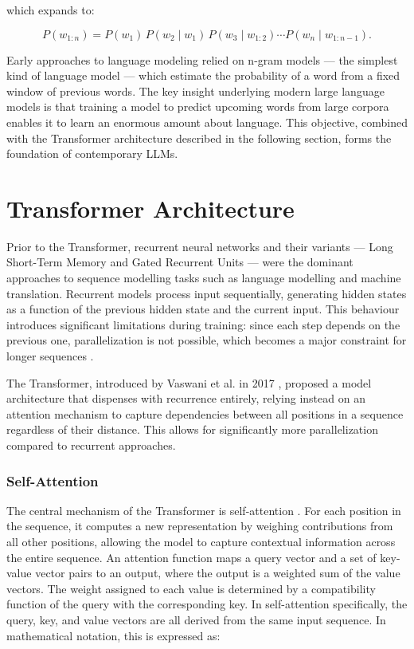     which expands to:

    \begin{equation}
    P(w_{1:n}) = P(w_1)\,P(w_2 \mid w_1)\,P(w_3 \mid w_{1:2})
    \cdots P(w_n \mid w_{1:n-1}).
    \label{eq:lm-expanded}
    \end{equation}

  Early approaches to language modeling relied on n-gram models
  --- the simplest kind of language model --- which estimate the
  probability of a word from a fixed window of previous words.
  The key insight underlying modern large language models is that
  training a model to predict upcoming words from large corpora
  enables it to learn an enormous amount about language. This objective, combined with the
  Transformer architecture described in the following section,
  forms the foundation of contemporary LLMs.

\section{Transformer Architecture}
\label{sec:transformer}
Prior to the Transformer, recurrent neural networks and their
variants --- Long Short-Term Memory and Gated Recurrent Units --- were
the dominant approaches to sequence modelling tasks such as language
modelling and machine translation. Recurrent models process input
sequentially, generating hidden states as a function of the previous
hidden state and the current input. This behaviour introduces significant limitations
during
  training: since each step depends on the previous one,
  parallelization is not possible, which becomes a major
  constraint for longer sequences \cite{vaswani2017}.

The Transformer, introduced by Vaswani et al. in 2017
  \cite{vaswani2017}, proposed a model architecture that
  dispenses with recurrence entirely, relying instead on an
  attention mechanism to capture dependencies between all
  positions in a sequence regardless of their distance. This allows for significantly more
  parallelization
compared to recurrent approaches.

\subsubsection*{Self-Attention}
The central mechanism of the Transformer is self-attention  \cite{vaswani2017}.
  For each position in the sequence, it computes a new
  representation by weighing contributions from all other
  positions, allowing the model to capture contextual
  information across the entire sequence. An attention function
  maps a query vector and a set of key-value vector pairs to
  an output, where the output is a weighted sum of the value
  vectors. The weight assigned to each value is determined by
  a compatibility function of the query with the corresponding
  key. In self-attention specifically, the
  query, key, and value vectors are all derived from the same
  input sequence. In mathematical notation, this is expressed
  as:

